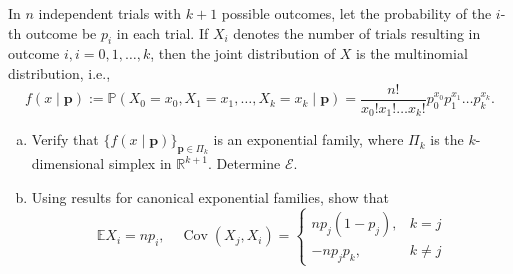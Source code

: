 \begin{exercise}
    In \(n\) independent trials with \(k+1\) possible outcomes, let the probability of the \(i\)-th outcome be \(p_{i}\) in each trial. If \(X_{i}\) denotes the number of trials resulting in outcome \(i, i=0,1, \ldots, k\), then the joint distribution of \(X\) is the multinomial distribution, i.e., 
    \[
        f( x \mid \mathbf{p}):=\mathbb{P}\left(X_{0}=x_{0}, X_{1}=x_{1}, \ldots, X_{k}=x_{k} \mid \mathbf{p}\right)=\frac{n !}{x_{0} ! x_{1} ! \ldots x_{k} !} p_{0}^{x_{0}} p_{1}^{x_{1}} \ldots p_{k}^{x_{k}}. 
    \]
    \begin{enumerate}[(a)]
        \item Verify that \(\{f( x \mid \mathbf{p})\}_{\mathbf{p} \in \Pi_{k}}\) is an exponential family, where \(\Pi_{k}\) is the \(k\)-dimensional simplex in \(\mathbb{R}^{k+1}\). Determine \(\mathcal{E}\). 
        \item Using results for canonical exponential families, show that
        \[
            \mathbb{E} X_{i}=n p_{i}, \quad \operatorname{Cov}\left(X_{j}, X_{i}\right)=\left\{\begin{array}{cc}
            n p_{j}\left(1-p_{j}\right), & k=j \\
            -n p_{j} p_{k}, & k \neq j
        \end{array}\right.
        \]
    \end{enumerate}
\end{exercise}

